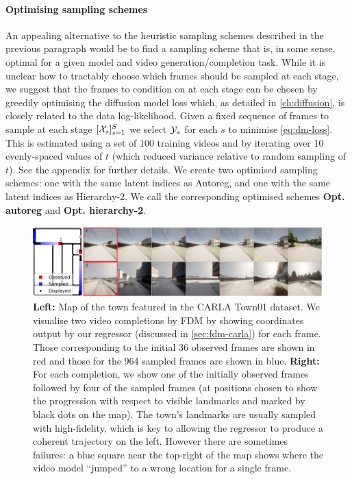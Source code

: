 \paragraph{Optimising sampling schemes}
An appealing alternative to the heuristic sampling schemes described in the previous paragraph would be to find a sampling scheme that is, in some sense, optimal for a given model and video generation/completion task. While it is unclear how to tractably choose which frames should be sampled at each stage, we suggest that the frames to condition on at each stage can be chosen by greedily optimising the diffusion model loss which, as detailed in \cref{ch:diffusion}, is closely related to the data log-likelihood. Given a fixed sequence of frames to sample at each stage $[\mathcal{X}_s]_{s=1}^S$ we select $\mathcal{Y}_s$ for each $s$ to minimise \cref{eq:dm-loss}. This is estimated using a set of 100 training videos and by iterating over 10 evenly-spaced values of $t$ (which reduced variance relative to random sampling of $t$). See the appendix for further details. We create two optimised sampling schemes: one with the same latent indices as Autoreg, and one with the same latent indices as Hierarchy-2. We call the corresponding optimised schemes \textbf{Opt. autoreg} and \textbf{Opt. hierarchy-2}.


\begin{figure}
    \centering
    \includegraphics[width=1\textwidth]{figs/fdm/carla_map_7panel}
    \caption{\textbf{Left:} Map of the town featured in the CARLA Town01 dataset. We visualise two video completions by FDM by showing coordinates output by our regressor (discussed in \cref{sec:fdm-carla}) for each frame. Those corresponding to the initial 36 observed frames are shown in red and those for the 964 sampled frames are shown in blue. \textbf{Right:} For each completion, we show one of the initially observed frames followed by four of the sampled frames (at positions chosen to show the progression with respect to visible landmarks and marked by black dots on the map). The town's landmarks are usually sampled with high-fidelity, which is key to allowing the regressor  to produce a coherent trajectory on the left. However there are sometimes failures: a blue square near the top-right of the map shows where the video model ``jumped'' to a wrong location for a single frame.}
    \label{fig:carla}
\end{figure}


